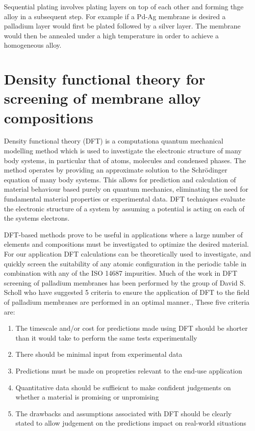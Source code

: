Sequential plating involves plating layers on top of each other and forming thge alloy in a subsequent step. For example if a Pd-Ag membrane is desired a palladium layer would first be plated followed by a silver layer. \cite{Exter2015} The membrane would then be annealed under a high temperature in order to achieve a homogeneous alloy. 

\section{Density functional theory for screening of membrane alloy compositions}

Density functional theory (DFT) is a computationa quantum mechanical modelling method which is used to investigate the electronic structure of many body systems, in particular that of atoms, molecules and condensed phases. The method operates by providing an approximate solution to the Schrödinger equation of many body systems. This allows for prediction and calculation of material behaviour based purely on quantum mechanics, eliminating the need for fundamental material properties or experimental data. DFT techniques evaluate the electronic structure of a system by assuming a potential is acting on each of the systems electrons. 

DFT-based methods prove to be useful in applications where a large number of elements and compositions must be investigated to optimize the desired material. For our application DFT calculations can be theoretically used to investigate, and quickly screen the suitability of any atomic configuration in the periodic table in combination with any of the ISO 14687 impurities. Much of the work in DFT screening of palladium membranes has been performed by the group of David S. Scholl who have suggested 5 criteria to ensure the application of DFT to the field of palladium membranes are performed in an optimal manner.\cite{SHOLL2007462}, \cite{doi:10.1021/ar500018b} These five criteria are:

\begin{enumerate}
    \item The timescale and/or cost for predictions made using DFT should be shorter than it would take to perform the same tests experimentally
    \item There should be minimal input from experimental data
    \item Predictions must be made on propreties relevant to the end-use application
    \item Quantitative data should be suffieicnt to make confident judgements on whether a material is promising or unpromising
    \item The drawbacks and assumptions associated with DFT should be clearly stated to allow judgement on the predictions impact on real-world situations
\end{enumerate}

